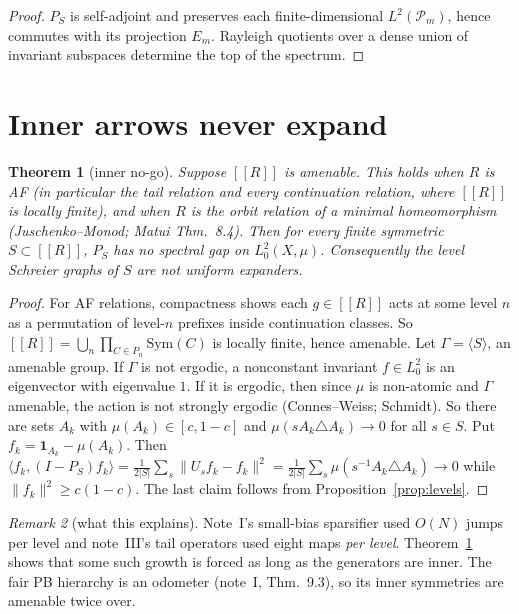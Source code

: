 \documentclass[11pt]{article}
\newtheorem{theorem}{Theorem}[section]
\theoremstyle{definition}
\theoremstyle{remark}
\newtheorem{remark}[theorem]{Remark}
\newcommand{\ff}[1]{[\![#1]\!]}
\begin{document}
\begin{proof}
$P_S$ is self-adjoint and preserves each finite-dimensional $L^2(\mathcal P_m)$, hence commutes with its projection $E_m$. Rayleigh quotients over a dense union of invariant subspaces determine the top of the spectrum.
\end{proof}

\section{Inner arrows never expand}

\begin{theorem}[inner no-go]\label{thm:nogo}
Suppose $\ff R$ is amenable. This holds when $R$ is AF (in particular the tail relation and every continuation relation, where $\ff R$ is locally finite), and when $R$ is the orbit relation of a minimal homeomorphism (Juschenko--Monod; Matui Thm.~8.4). Then for every finite symmetric $S\subset\ff R$, $P_S$ has no spectral gap on $L^2_0(X,\mu)$. Consequently the level Schreier graphs of $S$ are not uniform expanders.
\end{theorem}

\begin{proof}
For AF relations, compactness shows each $g\in\ff R$ acts at some level $n$ as a permutation of level-$n$ prefixes inside continuation classes. So $\ff R=\bigcup_n\prod_{C\in P_n}\mathrm{Sym}(C)$ is locally finite, hence amenable.
Let $\Gamma=\langle S\rangle$, an amenable group. If $\Gamma$ is not ergodic, a nonconstant invariant $f\in L^2_0$ is an eigenvector with eigenvalue $1$. If it is ergodic, then since $\mu$ is non-atomic and $\Gamma$ amenable, the action is not strongly ergodic (Connes--Weiss; Schmidt). So there are sets $A_k$ with $\mu(A_k)\in[c,1-c]$ and $\mu(sA_k\triangle A_k)\to0$ for all $s\in S$. Put $f_k=\mathbf 1_{A_k}-\mu(A_k)$. Then $\langle f_k,(I-P_S)f_k\rangle=\frac1{2|S|}\sum_s\|U_sf_k-f_k\|^2=\frac1{2|S|}\sum_s\mu(s^{-1}A_k\triangle A_k)\to0$ while $\|f_k\|^2\ge c(1-c)$. The last claim follows from Proposition~\ref{prop:levels}.
\end{proof}

\begin{remark}[what this explains]
Note~I's small-bias sparsifier used $O(N)$ jumps per level and note~III's tail operators used eight maps \emph{per level}. Theorem~\ref{thm:nogo} shows that some such growth is forced as long as the generators are inner. The fair PB hierarchy is an odometer (note~I, Thm.~9.3), so its inner symmetries are amenable twice over.
\end{remark}
\end{document}

